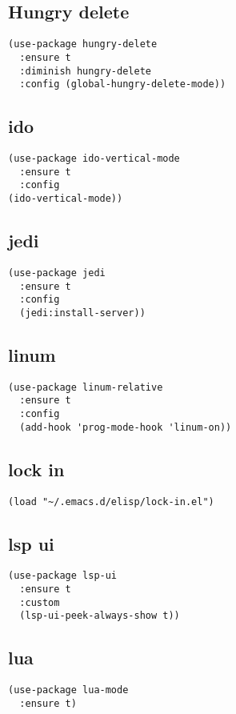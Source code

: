 \documentclass[11pt]{article}
\begin{document}
\subsection{Hungry delete}
\label{sec-2-17}
\begin{verbatim}
(use-package hungry-delete
  :ensure t
  :diminish hungry-delete
  :config (global-hungry-delete-mode))
\end{verbatim}
\subsection{ido}
\label{sec-2-18}
\begin{verbatim}
(use-package ido-vertical-mode
  :ensure t
  :config 
(ido-vertical-mode))
\end{verbatim}
\subsection{jedi}
\label{sec-2-19}
\begin{verbatim}
(use-package jedi
  :ensure t
  :config
  (jedi:install-server))
\end{verbatim}
\subsection{linum}
\label{sec-2-20}
\begin{verbatim}
(use-package linum-relative
  :ensure t 
  :config
  (add-hook 'prog-mode-hook 'linum-on))
\end{verbatim}
\subsection{lock in}
\label{sec-2-21}
\begin{verbatim}
(load "~/.emacs.d/elisp/lock-in.el")
\end{verbatim}
\subsection{lsp ui}
\label{sec-2-22}
\begin{verbatim}
(use-package lsp-ui
  :ensure t
  :custom
  (lsp-ui-peek-always-show t))
\end{verbatim}
\subsection{lua}
\label{sec-2-23}
\begin{verbatim}
(use-package lua-mode
  :ensure t)
\end{verbatim}
\end{document}
